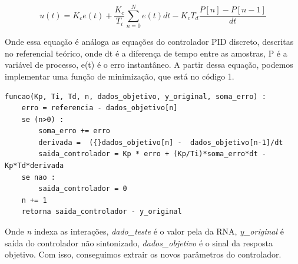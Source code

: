 \begin{equation}\label{eq:motor_accel}
u(t) = K_c e(t) + \frac{K_c}{T_i}\sum_{n=0}^{N}{e(t)dt}-K_cT_d\frac{P[n]-P[n-1]}{dt}
\end{equation}

Onde essa equação é análoga as equações do controlador PID discreto, descritas no referencial teórico, onde dt é a diferença de tempo entre as amostras, P é a variável de processo, e(t) é o erro instantâneo. A partir dessa equação, podemos implementar uma função de minimização, que está no código 1.

\begin{lstlisting}[caption={Minimização da função do controlador PID}]
funcao(Kp, Ti, Td, n, dados_objetivo, y_original, soma_erro) :
    erro = referencia - dados_objetivo[n]
    se (n>0) :
        soma_erro += erro
        derivada =  ({}dados_objetivo[n] -  dados_objetivo[n-1]/dt
        saida_controlador = Kp * erro + (Kp/Ti)*soma_erro*dt - Kp*Td*derivada
    se nao :
        saida_controlador = 0
    n += 1
    retorna saida_controlador - y_original
\end{lstlisting}

Onde \textit{n} indexa as interações, \textit{dado\_teste} é o valor pela da RNA, \textit{y\_original} é saída do controlador não sintonizado, \textit{dados\_objetivo} é o sinal da resposta objetivo. Com isso, conseguimos extrair os novos parâmetros do controlador.
